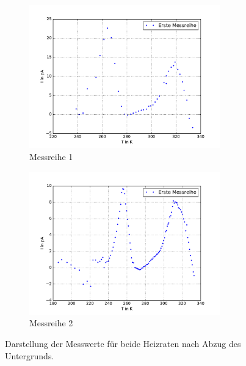 \begin{figure}[H]
  \begin{subfigure}{0.48\textwidth}
   \includegraphics[height=6.2cm]{plots/ohneuntergrund.pdf}
   \caption{Messreihe 1}
   \label{fig:mess1o}
 \end{subfigure}
 \begin{subfigure}{0.48\textwidth}
   \includegraphics[height=6.2cm]{plots/ohneuntergrund2.pdf}
   \caption{Messreihe 2}
   \label{fig:mess2o}
 \end{subfigure}
 \caption{Darstellung der Messwerte für beide Heizraten nach Abzug des Untergrunds.}
 \label{fig:ohneunter}
\end{figure}

